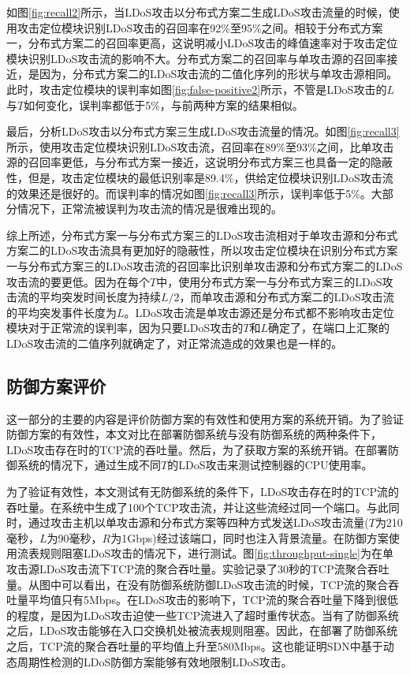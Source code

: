 如图\ref{fig:recall2}所示，当LDoS攻击以分布式方案二生成LDoS攻击流量的时候，使用攻击定位模块识别LDoS攻击的召回率在92\%至95\%之间。相较于分布式方案一，分布式方案二的召回率更高，这说明减小LDoS攻击的峰值速率对于攻击定位模块识别LDoS攻击流的影响不大。分布式方案二的召回率与单攻击源的召回率接近，是因为，分布式方案二的LDoS攻击流的二值化序列的形状与单攻击源相同。此时，攻击定位模块的误判率如图\ref{fig:false-positive2}所示，不管是LDoS攻击的$L$与$T$如何变化，误判率都低于5\%，与前两种方案的结果相似。

最后，分析LDoS攻击以分布式方案三生成LDoS攻击流量的情况。如图\ref{fig:recall3}所示，使用攻击定位模块识别LDoS攻击流，召回率在89\%至93\%之间，比单攻击源的召回率更低，与分布式方案一接近，这说明分布式方案三也具备一定的隐蔽性，但是，攻击定位模块的最低识别率是89.4\%，供给定位模块识别LDoS攻击流的效果还是很好的。而误判率的情况如图\ref{fig:recall3}所示，误判率低于5\%。大部分情况下，正常流被误判为攻击流的情况是很难出现的。

综上所述，分布式方案一与分布式方案三的LDoS攻击流相对于单攻击源和分布式方案二的LDoS攻击流具有更加好的隐蔽性，所以攻击定位模块在识别分布式方案一与分布式方案三的LDoS攻击流的召回率比识别单攻击源和分布式方案二的LDoS攻击流的要更低。因为在每个$T$中，使用分布式方案一与分布式方案三的LDoS攻击流的平均突发时间长度为持续$L/2$，而单攻击源和分布式方案二的LDoS攻击流的平均突发事件长度为$L$。LDoS攻击流是单攻击源还是分布式都不影响攻击定位模块对于正常流的误判率，因为只要LDoS攻击的$T$和$L$确定了，在端口上汇聚的LDoS攻击流的二值序列就确定了，对正常流造成的效果也是一样的。


\subsection{防御方案评价}
\label{chap05:evaluaion}

这一部分的主要的内容是评价防御方案的有效性和使用方案的系统开销。为了验证防御方案的有效性，本文对比在部署防御系统与没有防御系统的两种条件下，LDoS攻击存在时的TCP流的吞吐量。然后，为了获取方案的系统开销。在部署防御系统的情况下，通过生成不同$T$的LDoS攻击来测试控制器的CPU使用率。

为了验证有效性，本文测试有无防御系统的条件下，LDoS攻击存在时的TCP流的吞吐量。在系统中生成了100个TCP攻击流，并让这些流经过同一个端口。与此同时，通过攻击主机以单攻击源和分布式方案等四种方式发送LDoS攻击流量($T$为210毫秒，$L$为90毫秒，$R$为1Gbps)经过该端口，同时也注入背景流量。在防御方案使用流表规则阻塞LDoS攻击的情况下，进行测试。图\ref{fig:throughput-single}为在单攻击源LDoS攻击流下TCP流的聚合吞吐量。实验记录了30秒的TCP流聚合吞吐量。从图中可以看出，在没有防御系统防御LDoS攻击流的时候，TCP流的聚合吞吐量平均值只有5Mbps。在LDoS攻击的影响下，TCP流的聚合吞吐量下降到很低的程度，是因为LDoS攻击迫使一些TCP流进入了超时重传状态。当有了防御系统之后，LDoS攻击能够在入口交换机处被流表规则阻塞。因此，在部署了防御系统之后，TCP流的聚合吞吐量的平均值上升至580Mbps。这也能证明SDN中基于动态周期性检测的LDoS防御方案能够有效地限制LDoS攻击。

